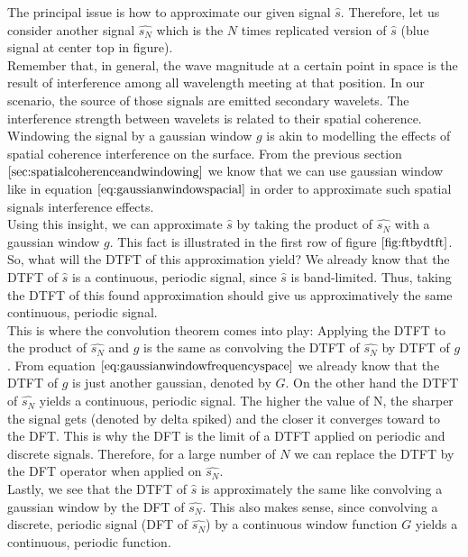 The principal issue is how to approximate our given signal $\hat{s}$. Therefore, let us consider another signal $\hat{s_N}$ which is the $N$ times replicated version of $\hat{s}$ (blue signal at center top in figure). \\

Remember that, in general, the wave magnitude at a certain point in space is the result of interference among all wavelength meeting at that position. In our scenario, the source of those signals are emitted secondary wavelets. The interference strength between wavelets is related to their spatial coherence. Windowing the signal by a gaussian window $g$ is akin to modelling the effects of spatial coherence interference on the surface. From the previous section $\ref{sec:spatialcoherenceandwindowing}$ we know that we can use gaussian window like in equation $\ref{eq:gaussianwindowspacial}$ in order to approximate such spatial signals interference effects. \\

Using this insight, we can approximate $\hat{s}$ by taking the product of $\hat{s_N}$ with a gaussian window $g$. This fact is illustrated in the first row of figure $\ref{fig:ftbydtft}$. So, what will the DTFT of this approximation yield? We already know that the DTFT of $\hat{s}$ is a continuous, periodic signal, since $\hat{s}$ is band-limited. Thus, taking the DTFT of this found approximation should give us approximatively the same continuous, periodic signal. \\

This is where the convolution theorem comes into play: Applying the DTFT to the product of $\hat{s_N}$ and $g$ is the same as convolving the DTFT of $\hat{s_N}$ by DTFT of $g$. From equation $\ref{eq:gaussianwindowfrequencyspace}$ we already know that the DTFT of $g$ is just another gaussian, denoted by $G$. On the other hand the DTFT of $\hat{s_N}$ yields a continuous, periodic signal. The higher the value of N, the sharper the signal gets (denoted by delta spiked) and the closer it converges toward to the DFT. This is why the DFT is the limit of a DTFT applied on periodic and discrete signals. Therefore, for a large number of $N$ we can replace the DTFT by the DFT operator when applied on $\hat{s_N}$. \\

Lastly, we see that the DTFT of $\hat{s}$ is approximately the same like convolving a gaussian window by the DFT of $\hat{s_N}$. This also makes sense, since convolving a discrete, periodic signal (DFT of $\hat{s_N}$) by a continuous window function $G$ yields a continuous, periodic function. \\


